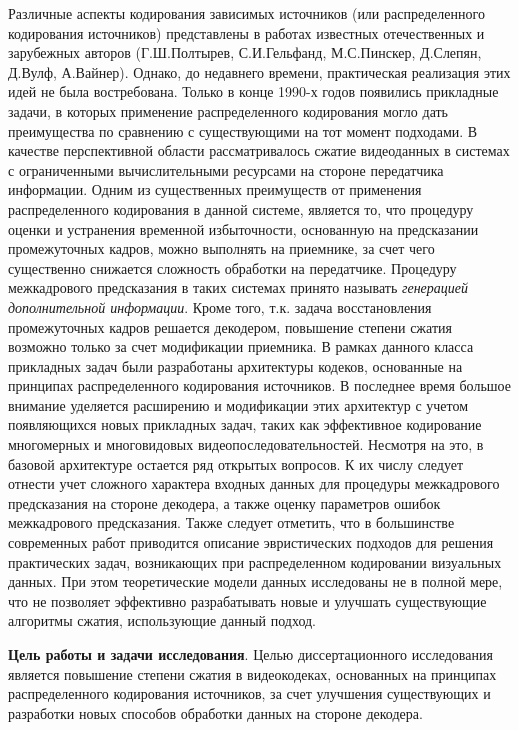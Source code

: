 Различные аспекты кодирования зависимых источников (или распределенного кодирования источников) представлены в работах известных отечественных и зарубежных авторов (Г.Ш.Полтырев, С.И.Гельфанд, М.С.Пинскер, Д.Слепян, Д.Вулф, А.Вайнер). Однако, до недавнего времени, практическая реализация этих идей не была востребована. Только в конце 1990-х годов появились прикладные задачи, в которых применение распределенного кодирования могло дать преимущества по сравнению с существующими на тот момент подходами. В качестве перспективной области рассматривалось сжатие видеоданных в системах с ограниченными вычислительными ресурсами на стороне передатчика информации. Одним из существенных преимуществ от применения распределенного кодирования в данной системе, является то, что процедуру оценки и устранения временной избыточности, основанную на предсказании промежуточных кадров, можно выполнять на приемнике, за счет чего существенно снижается сложность обработки на передатчике. Процедуру межкадрового предсказания в таких системах принято называть \emph{генерацией дополнительной информации}. Кроме того, т.к. задача восстановления промежуточных кадров решается декодером, повышение степени сжатия возможно только за счет модификации приемника. В рамках данного класса прикладных задач были разработаны архитектуры кодеков, основанные на принципах распределенного кодирования источников. В последнее время большое внимание уделяется расширению и модификации этих архитектур с учетом появляющихся новых прикладных задач, таких как эффективное кодирование многомерных и многовидовых видеопоследовательностей. Несмотря на это, в базовой архитектуре остается ряд открытых вопросов. К их числу следует отнести учет сложного характера входных данных для процедуры межкадрового предсказания на стороне декодера, а также оценку параметров ошибок межкадрового предсказания. Также следует отметить, что в большинстве современных работ приводится описание эвристических подходов для решения практических задач, возникающих при распределенном кодировании визуальных данных. При этом теоретические модели данных исследованы не в полной мере, что не позволяет эффективно разрабатывать новые и улучшать существующие алгоритмы сжатия, использующие данный подход.

\textbf{Цель работы и задачи исследования}. Целью диссертационного исследования является повышение степени сжатия в видеокодеках, основанных на принципах распределенного кодирования источников, за счет улучшения существующих и разработки новых способов обработки данных на стороне декодера.

